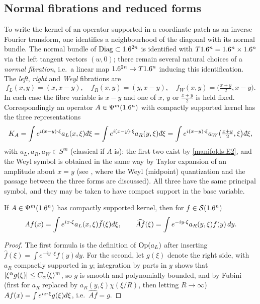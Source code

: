 \subsection{Normal fibrations and reduced forms}
To write the kernel of an operator supported in a coordinate patch as an
inverse Fourier transform, one identifies a neighbourhood of the diagonal with
its normal bundle. The normal bundle of $\operatorname{Diag}\subset1.6^{2n}$ is identified with
$T1.6^n=1.6^n\times1.6^n$ via the left tangent vectors $(w,0)$; there remain
several natural choices of a \emph{normal fibration}, i.e.\ a linear map
$1.6^{2n}\to T1.6^n$ inducing this identification. The \emph{left}, \emph{right}
and \emph{Weyl} fibrations are
\begin{equation*}
f_L(x,y)=(x,x-y),\quad f_R(x,y)=(y,x-y),\quad f_W(x,y)=\big(\tfrac{x+y}2,x-y\big).
\end{equation*}
In each case the fibre variable is $x-y$ and one of $x$, $y$ or $\frac{x+y}2$ is held
fixed. Correspondingly an operator $A\in\Psi^{m}(1.6^n)$ with compactly supported
kernel has the three representations
\begin{equation}\label{manifolds:eq:three-reps}
K_A=\int e^{i(x-y)\cdot\xi}a_L(x,\xi)\,\dbar\xi
=\int e^{i(x-y)\cdot\xi}a_R(y,\xi)\,\dbar\xi
=\int e^{i(x-y)\cdot\xi}a_W\big(\tfrac{x+y}2,\xi\big)\,\dbar\xi,
\end{equation}
with $a_L,a_R,a_W\in S^m$ (classical if $A$ is): the first two exist by
\ref{manifolds:E2}, and the Weyl symbol is obtained in the same way by Taylor
expansion of an amplitude about $x=y$ (see \cite[Section~18.5, in particular pp.~150--151 and~159]{Hormander-III}, where the Weyl (midpoint) quantization and the passage between the three forms are discussed).
All three have the same principal symbol, and they may be taken to have compact
support in the base variable.

\begin{lemma}\label{manifolds:lem:reduced}
If $A\in\Psi^{m}(1.6^n)$ has compactly supported kernel, then for $f\in\mathcal{S}(1.6^n)$
\begin{equation}\label{manifolds:eq:left-right}
Af(x)=\int e^{ix\cdot\xi}a_L(x,\xi)\hat f(\xi)\,\dbar\xi,\qquad
\widehat{Af}(\xi)=\int e^{-iy\cdot\xi}a_R(y,\xi)f(y)\,dy.
\end{equation}
\end{lemma}
\begin{proof}
The first formula is the definition of $\operatorname{Op}(a_L)$ after inserting
$\hat f(\xi)=\int e^{-iy\cdot\xi}f(y)dy$. For the second, let $g(\xi)$ denote the
right side, with $a_R$ compactly supported in $y$; integration by parts in $y$
shows that $|\xi^\alpha g(\xi)|\le C_\alpha\langle \xi\rangle^m$, so $g$ is smooth and
polynomially bounded, and by Fubini (first for $a_R$ replaced by
$a_R(y,\xi)\chi(\xi/R)$, then letting $R\to\infty$)
$Af(x)=\int e^{ix\cdot\xi}g(\xi)\,\dbar\xi$, i.e.\ $\widehat{Af}=g$.
\end{proof}

